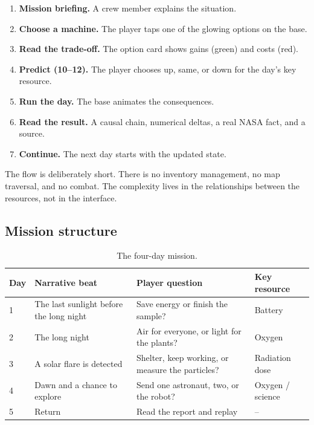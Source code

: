 \documentclass[11pt,a4paper]{article}
\begin{document}
\begin{enumerate}
  \item \textbf{Mission briefing.} A crew member explains the situation.
  \item \textbf{Choose a machine.} The player taps one of the glowing options on the base.
  \item \textbf{Read the trade-off.} The option card shows gains (green) and costs (red).
  \item \textbf{Predict (10--12).} The player chooses up, same, or down for the day's key resource.
  \item \textbf{Run the day.} The base animates the consequences.
  \item \textbf{Read the result.} A causal chain, numerical deltas, a real NASA fact, and a source.
  \item \textbf{Continue.} The next day starts with the updated state.
\end{enumerate}

The flow is deliberately short. There is no inventory management, no map traversal, and no combat. The complexity lives in the relationships between the resources, not in the interface.

\subsection{Mission structure}

\begin{table}[H]
\centering
\small
\begin{tabular}{@{}p{0.8cm}p{4.0cm}p{4.8cm}p{4.8cm}@{}}
\toprule
\textbf{Day} & \textbf{Narrative beat} & \textbf{Player question} & \textbf{Key resource}\\
\midrule
1 & The last sunlight before the long night & Save energy or finish the sample? & Battery\\
2 & The long night & Air for everyone, or light for the plants? & Oxygen\\
3 & A solar flare is detected & Shelter, keep working, or measure the particles? & Radiation dose\\
4 & Dawn and a chance to explore & Send one astronaut, two, or the robot? & Oxygen / science\\
5 & Return & Read the report and replay & --\\
\bottomrule
\end{tabular}
\caption{The four-day mission.}
\label{tab:mission}
\end{table}
\end{document}
